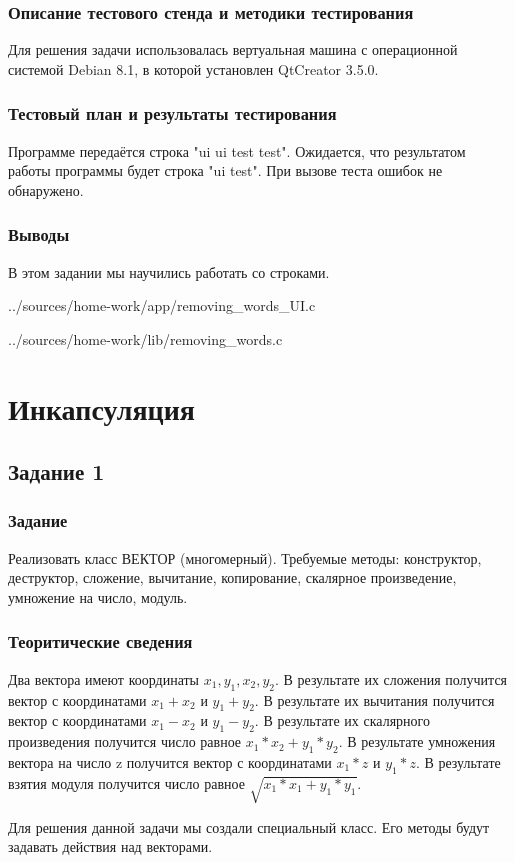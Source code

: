 \documentclass[12pt,a4paper]{report}
\begin{document}
\subsection{Описание тестового стенда и методики тестирования}
Для решения задачи использовалась вертуальная машина с операционной системой Debian 8.1, в которой установлен QtCreator 3.5.0. 
\subsection{Тестовый план и результаты тестирования}
Программе передаётся строка "ui ui test test". Ожидается, что результатом работы программы будет строка "ui test". При вызове теста ошибок не обнаружено.
\subsection{Выводы}
В этом задании мы научились работать со строками.

{../sources/home-work/app/removing_words_UI.c}


{../sources/home-work/lib/removing_words.c}
\chapter{Инкапсуляция}
\section{Задание 1}
\subsection{Задание}
Реализовать класс ВЕКТОР (многомерный). Требуемые методы: конструктор, деструктор, сложение, вычитание, копирование, скалярное произведение, умножение на число, модуль.
\subsection{Теоритические сведения}
Два вектора имеют координаты $ x_1, y_1, x_2, y_2 $. В результате их сложения получится вектор с координатами $ x_1+x_2 $ и $ y_1+y_2 $. В результате их вычитания получится вектор с координатами $ x_1-x_2 $ и $ y_1-y_2 $. В результате их скалярного произведения получится число равное $ x_1 * x_2 + y_1 * y_2 $. В результате умножения вектора на число z получится вектор с координатами $ x_1*z $ и $ y_1*z $. В результате взятия модуля получится число равное $ \sqrt{x_1*x_1+y_1*y_1} $. 

Для решения данной задачи мы создали специальный класс. Его методы будут задавать действия над векторами.
\end{document}
